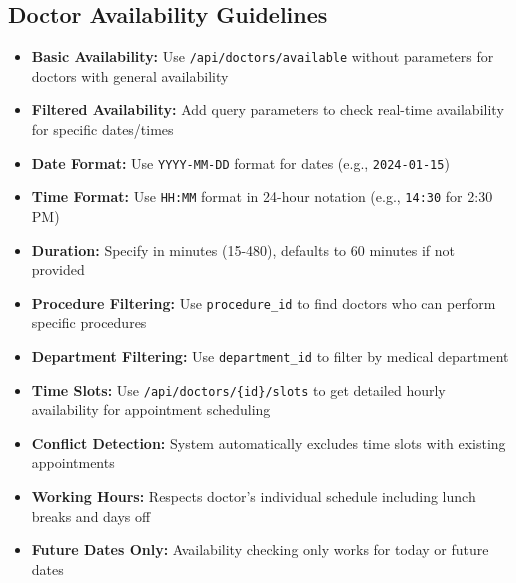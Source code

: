 \documentclass[12pt,a4paper]{article}
\begin{document}
\subsection{Doctor Availability Guidelines}

\begin{itemize}
    \item \textbf{Basic Availability:} Use \texttt{/api/doctors/available} without parameters for doctors with general availability
    \item \textbf{Filtered Availability:} Add query parameters to check real-time availability for specific dates/times
    \item \textbf{Date Format:} Use \texttt{YYYY-MM-DD} format for dates (e.g., \texttt{2024-01-15})
    \item \textbf{Time Format:} Use \texttt{HH:MM} format in 24-hour notation (e.g., \texttt{14:30} for 2:30 PM)
    \item \textbf{Duration:} Specify in minutes (15-480), defaults to 60 minutes if not provided
    \item \textbf{Procedure Filtering:} Use \texttt{procedure\_id} to find doctors who can perform specific procedures
    \item \textbf{Department Filtering:} Use \texttt{department\_id} to filter by medical department
    \item \textbf{Time Slots:} Use \texttt{/api/doctors/\{id\}/slots} to get detailed hourly availability for appointment scheduling
    \item \textbf{Conflict Detection:} System automatically excludes time slots with existing appointments
    \item \textbf{Working Hours:} Respects doctor's individual schedule including lunch breaks and days off
    \item \textbf{Future Dates Only:} Availability checking only works for today or future dates
\end{itemize}
\end{document}
